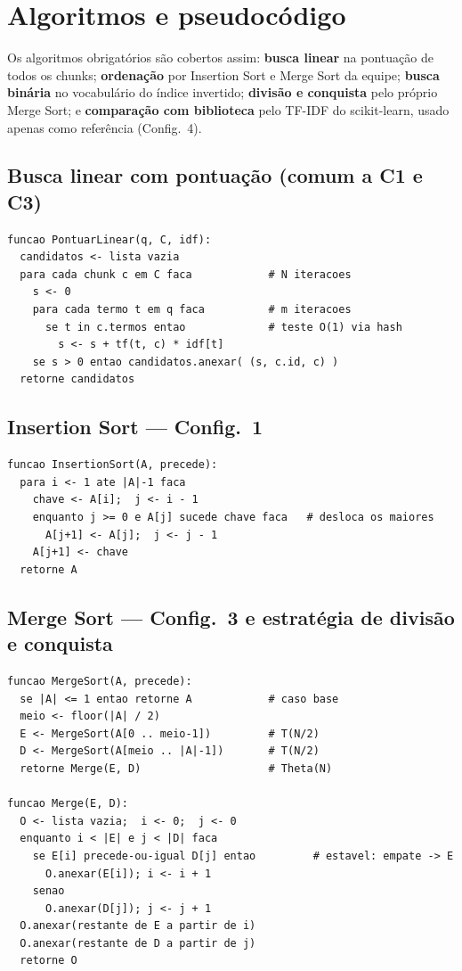 \documentclass[11pt,a4paper]{article}
\begin{document}
\section{Algoritmos e pseudocódigo}
Os algoritmos obrigatórios são cobertos assim: \textbf{busca linear} na pontuação de todos os chunks;
\textbf{ordenação} por Insertion Sort e Merge Sort da equipe; \textbf{busca binária} no vocabulário
do índice invertido; \textbf{divisão e conquista} pelo próprio Merge Sort; e \textbf{comparação com
biblioteca} pelo TF-IDF do scikit-learn, usado apenas como referência (Config.~4).

\subsection{Busca linear com pontuação (comum a C1 e C3)}
\begin{lstlisting}
funcao PontuarLinear(q, C, idf):
  candidatos <- lista vazia
  para cada chunk c em C faca            # N iteracoes
    s <- 0
    para cada termo t em q faca          # m iteracoes
      se t in c.termos entao             # teste O(1) via hash
        s <- s + tf(t, c) * idf[t]
    se s > 0 entao candidatos.anexar( (s, c.id, c) )
  retorne candidatos
\end{lstlisting}

\subsection{Insertion Sort --- Config.~1}
\begin{lstlisting}
funcao InsertionSort(A, precede):
  para i <- 1 ate |A|-1 faca
    chave <- A[i];  j <- i - 1
    enquanto j >= 0 e A[j] sucede chave faca   # desloca os maiores
      A[j+1] <- A[j];  j <- j - 1
    A[j+1] <- chave
  retorne A
\end{lstlisting}

\subsection{Merge Sort --- Config.~3 e estratégia de divisão e conquista}
\begin{lstlisting}
funcao MergeSort(A, precede):
  se |A| <= 1 entao retorne A            # caso base
  meio <- floor(|A| / 2)
  E <- MergeSort(A[0 .. meio-1])         # T(N/2)
  D <- MergeSort(A[meio .. |A|-1])       # T(N/2)
  retorne Merge(E, D)                    # Theta(N)

funcao Merge(E, D):
  O <- lista vazia;  i <- 0;  j <- 0
  enquanto i < |E| e j < |D| faca
    se E[i] precede-ou-igual D[j] entao         # estavel: empate -> E
      O.anexar(E[i]); i <- i + 1
    senao
      O.anexar(D[j]); j <- j + 1
  O.anexar(restante de E a partir de i)
  O.anexar(restante de D a partir de j)
  retorne O
\end{lstlisting}
\end{document}
